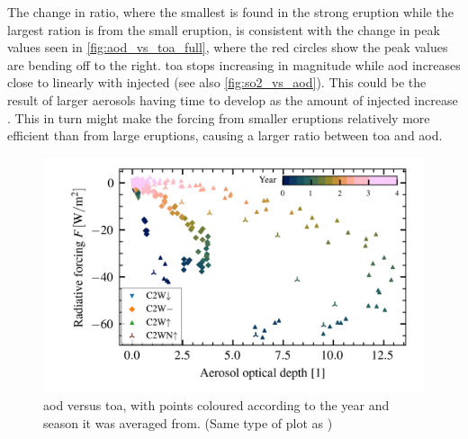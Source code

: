 \documentclass[twocol]{ametsocV5}
\begin{document}
The change in ratio, where the smallest is found in the strong eruption while the
largest ration is from the small eruption, is consistent with the change in peak values
seen in \cref{fig:aod_vs_toa_full}, where the red circles show the peak values are
bending off to the right. \acrshort{toa} stops increasing in magnitude while
\acrshort{aod} increases close to linearly with injected  (see also
\cref{fig:so2_vs_aod}). This could be the result of larger aerosols having time to
develop as the amount of injected  increase \citep{marshall2019}. This in turn
might make the forcing from smaller eruptions relatively more efficient than from large
eruptions, causing a larger ratio between \acrshort{toa} and \acrshort{aod}.

\begin{figure}
  \begin{center}
    \includegraphics[width=0.95\linewidth]{figures/aod_vs_toa_avg_loop.png}
  \end{center}
  \caption{
    \acrshort{aod} versus \acrshort{toa}, with points coloured according to the year and
    season it was averaged from. (Same type of plot as \citet{gregory2016})
  }%
  \label{fig:aod_vs_toa_avg_loop}
\end{figure}
\end{document}

